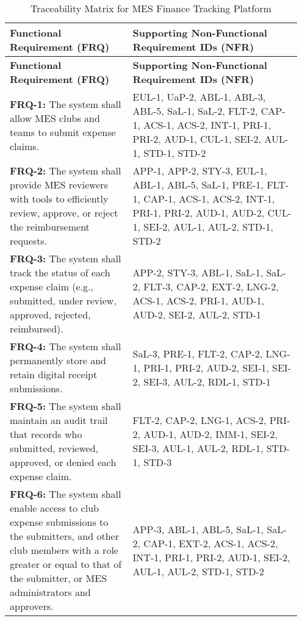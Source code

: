 \documentclass[12pt, titlepage]{article}
\begin{document}
\begin{longtable}{p{0.4\linewidth} p{0.55\linewidth}}
\caption{Traceability Matrix for MES Finance Tracking Platform} \\
\toprule
\textbf{Functional Requirement (FRQ)} & \textbf{Supporting Non-Functional Requirement IDs (NFR)} \\
\midrule
\endfirsthead
\toprule
\textbf{Functional Requirement (FRQ)} & \textbf{Supporting Non-Functional Requirement IDs (NFR)} \\
\midrule
\endhead
\bottomrule
\endfoot
\textbf{FRQ-1:} The system shall allow MES clubs and teams to submit expense claims. &
EUL-1, UaP-2, ABL-1, ABL-3, ABL-5, SaL-1, SaL-2, FLT-2, CAP-1, ACS-1, ACS-2, INT-1, PRI-1, PRI-2, AUD-1, CUL-1, SEI-2, AUL-1, STD-1, STD-2 \\
\midrule
\textbf{FRQ-2:} The system shall provide MES reviewers with tools to efficiently review, approve, or reject the reimbursement requests. &
APP-1, APP-2, STY-3, EUL-1, ABL-1, ABL-5, SaL-1, PRE-1, FLT-1, CAP-1, ACS-1, ACS-2, INT-1, PRI-1, PRI-2, AUD-1, AUD-2, CUL-1, SEI-2, AUL-1, AUL-2, STD-1, STD-2 \\
\midrule
\textbf{FRQ-3:} The system shall track the status of each expense claim (e.g., submitted, under review, approved, rejected, reimbursed). &
APP-2, STY-3, ABL-1, SaL-1, SaL-2, FLT-3, CAP-2, EXT-2, LNG-2, ACS-1, ACS-2, PRI-1, AUD-1, AUD-2, SEI-2, AUL-2, STD-1 \\
\midrule
\textbf{FRQ-4:} The system shall permanently store and retain digital receipt submissions. &
SaL-3, PRE-1, FLT-2, CAP-2, LNG-1, PRI-1, PRI-2, AUD-2, SEI-1, SEI-2, SEI-3, AUL-2, RDL-1, STD-1 \\
\midrule
\textbf{FRQ-5:} The system shall maintain an audit trail that records who submitted, reviewed, approved, or denied each expense claim. &
FLT-2, CAP-2, LNG-1, ACS-2, PRI-2, AUD-1, AUD-2, IMM-1, SEI-2, SEI-3, AUL-1, AUL-2, RDL-1, STD-1, STD-3 \\
\midrule
\textbf{FRQ-6:} The system shall enable access to club expense submissions to the submitters, and other club members with a role greater or equal to that of the submitter, or MES administrators and approvers. &
APP-3, ABL-1, ABL-5, SaL-1, SaL-2, CAP-1, EXT-2, ACS-1, ACS-2, INT-1, PRI-1, PRI-2, AUD-1, SEI-2, AUL-1, AUL-2, STD-1, STD-2 \\
\bottomrule
\end{longtable}
\end{document}
